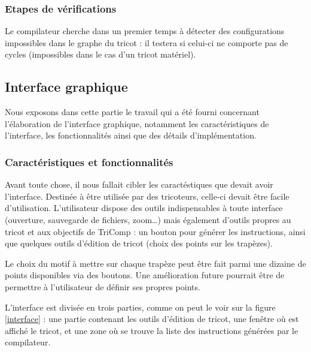 \documentclass{article}
\begin{document}
\pagebreak

\subsubsection{Etapes de vérifications}

Le compilateur cherche dans un premier temps à détecter des configurations 
impossibles dans le graphe du tricot : il testera si celui-ci ne comporte pas de cycles 
(impossibles dans le cas d'un tricot matériel).

\subsection{Interface graphique}

Nous exposons dans cette partie le travail qui a été fourni concernant
l'élaboration de l'interface graphique, notamment les caractéristiques
de l'interface, les fonctionnalités ainsi que des détails
d'implémentation.

\subsubsection{Caractéristiques et fonctionnalités}

Avant toute chose, il nous fallait cibler les caractéstiques que
devait avoir l'interface. Destinée à être utilisée par des tricoteurs,
celle-ci devait être facile d'utilisation. L'utilisateur dispose des
outils indispensables à toute interface (ouverture, sauvegarde de
fichiers, zoom\dots) mais également d'outils propres au tricot et aux
objectifs de TriComp : un bouton pour générer les instructions, ainsi
que quelques outils d'édition de tricot (choix des points sur les
trapèzes).

Le choix du motif à mettre sur chaque trapèze peut être fait parmi une
dizaine de points disponibles via des boutons. Une amélioration future
pourrait être de permettre à l'utilisateur de définir ses propres points.

L'interface est divisée en trois parties, comme on peut le voir sur la 
figure \ref{interface} : une partie contenant les
outils d'édition de tricot, une fenêtre où est affiché le tricot, et
une zone où se trouve la liste des instructions générées par le
compilateur.
\end{document}
